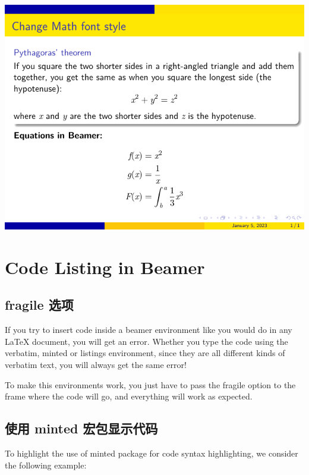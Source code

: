 \includegraphics{examples/beamer/beamerfont12.pdf}

\section{Code Listing in Beamer}

\subsection{{\ttfamily fragile} 选项}

If you try to insert code inside a beamer environment like you would do in any LaTeX document, you will get an error. Whether you type the code using the verbatim, minted or listings environment, since they are all different kinds of verbatim text, you will always get the same error!

To make this environments work, you just have to pass the {\ttfamily fragile} option to the frame where the code will go, and everything will work as expected. 

\subsection{使用 minted 宏包显示代码}

To highlight the use of minted package for code syntax highlighting, we consider the following example:

\inputminted[linenos=true]{latex}{examples/beamer/beamercodelisting01.tex}

